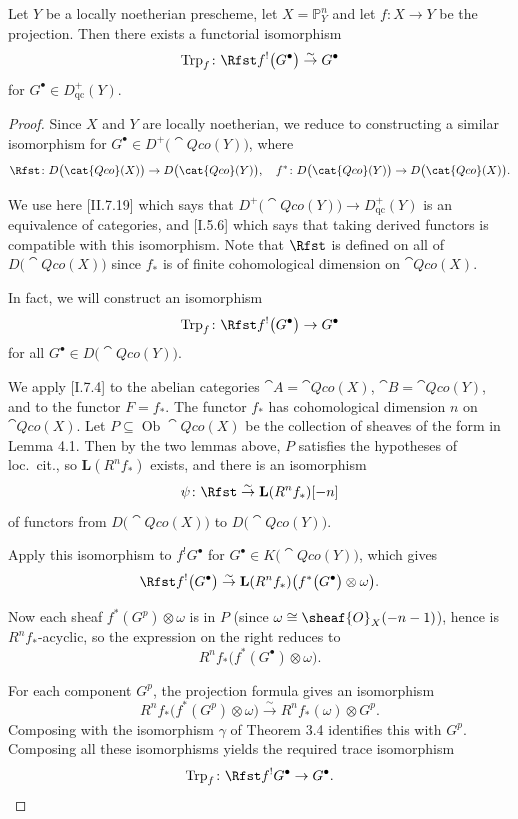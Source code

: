 \setcounter{page}{156}
\begin{proposition}
Let \(Y\) be a locally noetherian prescheme, let \(X=\mathbb{P}_{Y}^{n}\) and let \(f\colon X \to Y\) be the projection. Then there exists a functorial isomorphism
\[
\operatorname{Trp}_f\colon \Rfst f^!\bigl(G^\bullet\bigr) \stackrel{\sim}{\to} G^\bullet
\]
for \(G^\bullet \in D_{\mathrm{qc}}^+(Y)\).
\end{proposition}

\begin{proof}
Since \(X\) and \(Y\) are locally noetherian, we reduce to constructing a similar isomorphism for \(G^\bullet \in D^+\bigl(\cat{Qco}(Y)\bigr)\), where
\[
\Rfst\colon D\bigl(\cat{Qco}(X)\bigr) \to D\bigl(\cat{Qco}(Y)\bigr), \quad
f^*\colon D\bigl(\cat{Qco}(Y)\bigr) \to D\bigl(\cat{Qco}(X)\bigr).
\]

We use here [II.7.19] which says that \(D^+\bigl(\cat{Qco}(Y)\bigr) \to D_{\mathrm{qc}}^+(Y)\) is an equivalence of categories, and [I.5.6] which says that taking derived functors is compatible with this isomorphism. Note that \(\Rfst\) is defined on all of \(D\bigl(\cat{Qco}(X)\bigr)\) since \(f_*\) is of finite cohomological dimension on \(\cat{Qco}(X)\).

In fact, we will construct an isomorphism
\[
\operatorname{Trp}_f\colon \Rfst f^!\bigl(G^\bullet\bigr) \to G^\bullet
\]
for all \(G^\bullet \in D\bigl(\cat{Qco}(Y)\bigr)\).

\setcounter{page}{157}
We apply [I.7.4] to the abelian categories \(\cat{A}=\cat{Qco}(X)\), \(\cat{B}=\cat{Qco}(Y)\), and to the functor \(F=f_*\). The functor \(f_*\) has cohomological dimension \(n\) on \(\cat{Qco}(X)\). Let \(P \subseteq \operatorname{Ob}\cat{Qco}(X)\) be the collection of sheaves of the form in Lemma 4.1. Then by the two lemmas above, \(P\) satisfies the hypotheses of loc.\ cit., so \(\mathbf{L}(R^n f_*)\) exists, and there is an isomorphism
\[
\psi\colon \Rfst \stackrel{\sim}{\to} \mathbf{L}(R^n f_*)[-n]
\]
of functors from \(D\bigl(\cat{Qco}(X)\bigr)\) to \(D\bigl(\cat{Qco}(Y)\bigr)\).

Apply this isomorphism to \(f^! G^\bullet\) for \(G^\bullet \in K\bigl(\cat{Qco}(Y)\bigr)\), which gives
\[
\Rfst f^!\bigl(G^\bullet\bigr)
\stackrel{\sim}{\to} \mathbf{L}(R^n f_*)\bigl(f^*\bigl(G^\bullet\bigr) \otimes \omega\bigr).
\]

Now each sheaf \(f^*(G^p) \otimes \omega\) is in \(P\) (since \(\omega \cong \sheaf{O}_X(-n-1)\)), hence is \(R^n f_*\)-acyclic, so the expression on the right reduces to
\[
R^n f_*\bigl(f^*(G^\bullet) \otimes \omega\bigr).
\]

For each component \(G^p\), the projection formula gives an isomorphism
\[
R^n f_*\bigl(f^*(G^p) \otimes \omega\bigr) 
\stackrel{\sim}{\to} R^n f_*(\omega) \otimes G^p.
\]
Composing with the isomorphism \(\gamma\) of Theorem 3.4 identifies this with \(G^p\). Composing all these isomorphisms yields the required trace isomorphism
\[
\operatorname{Trp}_f\colon \Rfst f^! G^\bullet \to G^\bullet.
\]
\end{proof}

